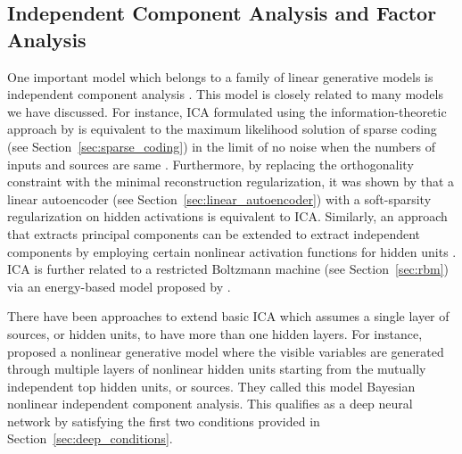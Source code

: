 \documentclass[dissertation,nocontribution,draft*]{aaltoseries}
\begin{document}


\subsection{Independent Component Analysis and Factor Analysis}
\label{sec:ica_fa}

One important model which belongs to a family of linear
generative models is independent component analysis
\citep[ICA, see, e.g.,][and references
therein]{Hyvarinen2001}. This model is closely related to
many models we have discussed.  For instance, ICA formulated
using the information-theoretic approach by \citet{Bell1995}
is equivalent to the maximum likelihood solution of sparse
coding (see Section~\ref{sec:sparse_coding}) in the limit of
no noise when the numbers of inputs and
sources are same \citep{Olshausen1997}.  Furthermore, by
replacing the orthogonality constraint with the minimal
reconstruction regularization, it was shown by
\citet{Le2011} that a linear autoencoder (see
Section~\ref{sec:linear_autoencoder}) with a
soft-sparsity regularization on hidden activations is
equivalent to ICA. Similarly, an approach that extracts
principal components can be extended to extract independent
components by employing certain nonlinear
activation functions for hidden units \citep[see,
e.g.,][]{Oja1997,Hyvarinen2001}. ICA is further related
to a restricted Boltzmann machine (see
Section~\ref{sec:rbm}) via an energy-based model proposed by
\citet{Teh2003}.

There have been approaches to extend basic ICA which
assumes a single layer of sources, or hidden units, to have
more than one hidden layers. For instance,
\citet{Lappalainen2000} proposed a nonlinear generative
model where the visible variables are generated through
multiple layers of nonlinear hidden units starting from the
mutually independent top hidden units, or sources. They
called this model Bayesian nonlinear independent component
analysis. This qualifies as a deep neural network by
satisfying the first two conditions provided in
Section~\ref{sec:deep_conditions}.
\end{document}
